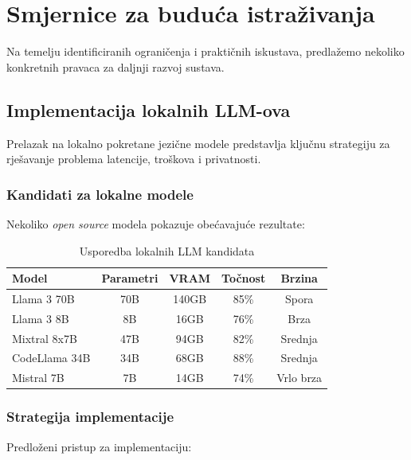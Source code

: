 \section{Smjernice za buduća istraživanja}

Na temelju identificiranih ograničenja i praktičnih iskustava, predlažemo nekoliko konkretnih pravaca za daljnji razvoj sustava.

\subsection{Implementacija lokalnih LLM-ova}

Prelazak na lokalno pokretane jezične modele predstavlja ključnu strategiju za rješavanje problema latencije, troškova i privatnosti.

\subsubsection{Kandidati za lokalne modele}

Nekoliko \textit{open source} modela pokazuje obećavajuće rezultate:

\begin{table}[htbp]
\centering
\caption{Usporedba lokalnih LLM kandidata}
\label{tab:local_llm_comparison}
\begin{tabular}{|l|c|c|c|c|}
\hline
\textbf{Model} & \textbf{Parametri} & \textbf{VRAM} & \textbf{Točnost} & \textbf{Brzina} \\
\hline
Llama 3 70B & 70B & 140GB & 85\% & Spora \\
Llama 3 8B & 8B & 16GB & 76\% & Brza \\
Mixtral 8x7B & 47B & 94GB & 82\% & Srednja \\
CodeLlama 34B & 34B & 68GB & 88\% & Srednja \\
Mistral 7B & 7B & 14GB & 74\% & Vrlo brza \\
\hline
\end{tabular}
\end{table}

\subsubsection{Strategija implementacije}

Predloženi pristup za implementaciju:

